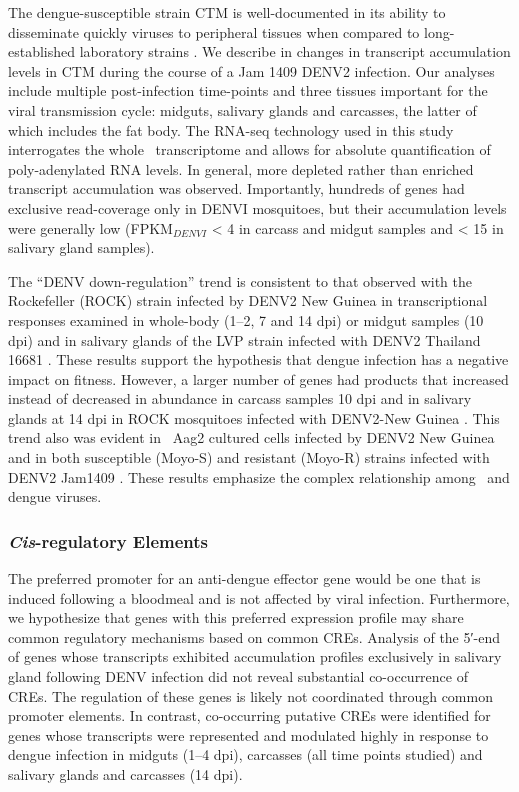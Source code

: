The dengue-susceptible strain \gls{CTM} is well-documented in its ability to disseminate quickly viruses to peripheral tissues when compared to long-established laboratory strains \cite{Salazar2007}.
We describe in \citet{bonizzoni2012complex} changes in transcript accumulation levels in \gls{CTM} during the course of a Jam 1409 \gls{DENV}2 infection.
Our analyses include multiple post-infection time-points and three tissues important for the viral transmission cycle: midguts, salivary glands and carcasses, the latter of which includes the fat body.
The RNA-seq technology used in this study interrogates the whole \Aa\ transcriptome and allows for absolute quantification of poly-adenylated RNA levels.
In general, more depleted rather than enriched transcript accumulation was observed.
Importantly, hundreds of genes had exclusive read-coverage only in \gls{DENVI} mosquitoes, but their accumulation levels were generally low (FPKM$_{DENVI}$ < 4 in carcass and midgut samples and < 15 in salivary gland samples).

The “\gls{DENV} down-regulation” trend is consistent to that observed with the Rockefeller (ROCK) strain infected by \gls{DENV}2 New Guinea in transcriptional responses examined in whole-body (1–2, 7 and 14 \gls{dpi}) or midgut samples (10 \gls{dpi}) and in salivary glands of the \gls{LVP} strain infected with \gls{DENV}2 Thailand 16681 \cite{Xi2008,Luplertlop2011,Sim2012,Colpitts2011}.
These results support the hypothesis that dengue infection has a negative impact on fitness.
However, a larger number of genes had products that increased instead of decreased in abundance in carcass samples 10 \gls{dpi} and in salivary glands at 14 \gls{dpi} in ROCK mosquitoes infected with \gls{DENV}2-New Guinea \cite{Xi2008,Sim2012}.
This trend also was evident in \Aa\ Aag2 cultured cells infected by \gls{DENV}2 New Guinea and in both susceptible (Moyo-S) and resistant (Moyo-R) strains infected with \gls{DENV}2 Jam1409 \cite{Sim2010,Behura2011}.
These results emphasize the complex relationship among \Aa\ and dengue viruses.



\subsubsection{\textit{Cis}-regulatory Elements}

The preferred promoter for an anti-dengue effector gene would be one that is induced following a bloodmeal and is not affected by viral infection.
Furthermore, we hypothesize that genes with this preferred expression profile may share common regulatory mechanisms based on common \glspl{CRE}.
Analysis of the 5′-end of genes whose transcripts exhibited accumulation profiles exclusively in salivary gland following \gls{DENV} infection did not reveal substantial co-occurrence of \glspl{CRE}.
The regulation of these genes is likely not coordinated through common promoter elements.
In contrast, co-occurring putative \glspl{CRE} were identified for genes whose transcripts were represented and modulated highly in response to dengue infection in midguts (1–4 \gls{dpi}), carcasses (all time points studied) and salivary glands and carcasses (14 \gls{dpi}).

